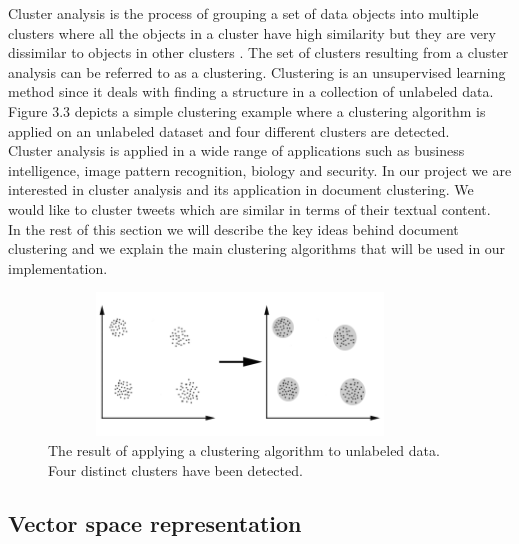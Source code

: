 Cluster analysis is the process of grouping a set of data objects into multiple clusters where all the
objects in a cluster have high similarity but they are very dissimilar to objects in other clusters \citep{han2005}. The set
of clusters resulting from a cluster analysis can be referred to as a clustering. Clustering is an unsupervised 
learning method since it deals with finding a structure in a collection of unlabeled data. Figure 3.3 depicts a simple 
clustering example where a clustering algorithm is applied on an unlabeled dataset and four different clusters are detected.\\
Cluster analysis is applied in a wide range of applications such as business intelligence, image pattern recognition, biology and 
security. In our project we are interested in cluster analysis and its application in document clustering. We would like to cluster tweets 
which are similar in terms of their textual content.\\
In the rest of this section we will describe the key ideas behind document clustering and we explain the main clustering algorithms that
will be used in our implementation.

\begin{figure}[!htbp]
  \begin{center}
    \includegraphics[height=1.5in, width=4in]{clustering}
    \caption{The result of applying a clustering algorithm to unlabeled data. Four distinct clusters have been detected.}
    \label{ClusteringExample}
  \end{center}
\end{figure} 

\subsection{Vector space representation}

